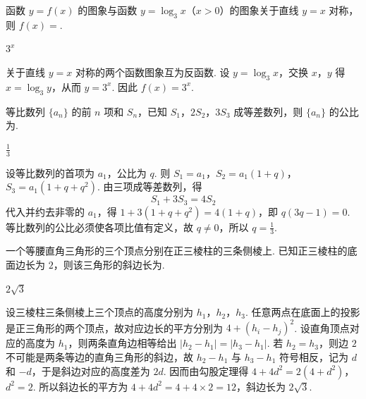 \begin{problem}
函数 \(y = f(x)\) 的图象与函数 \(y = \log_3 x\)（\(x > 0\)）的图象关于直线 \(y = x\) 对称，则 \(f(x) =\)\fillinblank{}.
\end{problem}

\begin{answer}
\(3^x\)
\end{answer}

\begin{solution}
关于直线 \(y=x\) 对称的两个函数图象互为反函数. 设 \(y=\log_3x\)，交换 \(x\)，\(y\) 得 \(x=\log_3y\)，从而 \(y=3^x\). 因此 \(f(x)=3^x\).
\end{solution}

\begin{problem}
等比数列 \(\{a_{n}\}\) 的前 \(n\) 项和 \(S_{n}\)，已知 \(S_{1}\)，\(2S_{2}\)，\(3S_{3}\) 成等差数列，则 \(\{a_{n}\}\) 的公比为\fillinblank{}.
\end{problem}

\begin{answer}
\(\frac{1}{3}\)
\end{answer}

\begin{solution}
设等比数列的首项为 \(a_1\)，公比为 \(q\). 则 \(S_1=a_1\)，\(S_2=a_1(1+q)\)，\(S_3=a_1(1+q+q^2)\). 由三项成等差数列，得
\[
S_1+3S_3=4S_2
\]
代入并约去非零的 \(a_1\)，得 \(1+3(1+q+q^2)=4(1+q)\)，即 \(q(3q-1)=0\). 等比数列的公比必须使各项比值有定义，故 \(q\ne0\)，所以 \(q=\frac13\).
\end{solution}

\begin{problem}
一个等腰直角三角形的三个顶点分别在正三棱柱的三条侧棱上. 已知正三棱柱的底面边长为 \(2\)，则该三角形的斜边长为\fillinblank{}.
\end{problem}

\begin{answer}
\(2\sqrt{3}\)
\end{answer}

\begin{solution}
设三棱柱三条侧棱上三个顶点的高度分别为 \(h_1\)，\(h_2\)，\(h_3\). 任意两点在底面上的投影是正三角形的两个顶点，故对应边长的平方分别为 \(4+(h_i-h_j)^2\). 设直角顶点对应的高度为 \(h_1\)，则两条直角边相等给出 \(|h_2-h_1|=|h_3-h_1|\). 若 \(h_2=h_3\)，则边 \(2\) 不可能是两条等边的直角三角形的斜边，故 \(h_2-h_1\) 与 \(h_3-h_1\) 符号相反，记为 \(d\) 和 \(-d\)，于是斜边对应的高度差为 \(2d\). 因而由勾股定理得
\(4+4d^2=2(4+d^2)\)，\(d^2=2\).
所以斜边长的平方为 \(4+4d^2=4+4\times2=12\)，斜边长为 \(2\sqrt3\).
\end{solution}

